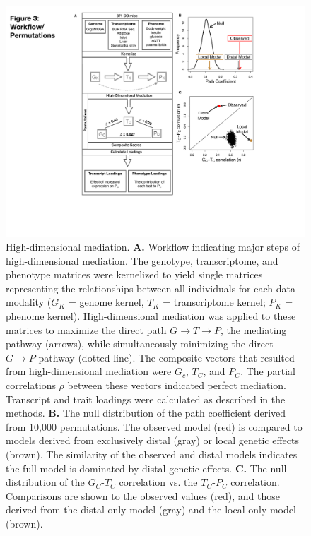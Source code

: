 \documentclass[
]{article}
\begin{document}
\begin{figure}[ht!]
\includegraphics[width=5in]{Figures/Fig3_workflow.pdf} 
\caption{High-dimensional mediation. \textbf{A.} Workflow 
indicating major steps of high-dimensional mediation. The 
genotype, transcriptome, and phenotype matrices were 
kernelized to yield single matrices representing the 
relationships between all individuals for each data modality 
($G_K$ = genome kernel, $T_K$ = transcriptome kernel; 
$P_K$ = phenome kernel). High-dimensional mediation 
was applied to these matrices to maximize the direct path 
$G \rightarrow T \rightarrow P$, the mediating pathway 
(arrows), while simultaneously minimizing the direct $G 
\rightarrow P$ pathway (dotted line). The composite 
vectors that resulted from high-dimensional mediation 
were $G_c$, $T_C$, and $P_C$. The partial correlations 
$\rho$ between these vectors indicated perfect mediation. 
Transcript and trait loadings were calculated as described 
in the methods. \textbf{B.} The null distribution of the path 
coefficient derived from 10,000 permutations. The observed model
(red) is compared to models derived from exclusively distal 
(gray) or local genetic effects (brown). The similarity of 
the observed and distal models indicates the full model is 
dominated by distal genetic effects. \textbf{C.} 
The null distribution of the $G_C$-$T_C$ correlation vs. 
the $T_C$-$P_C$ correlation. Comparisons are shown 
to the observed values (red), and those derived from the 
distal-only model (gray) and the local-only model (brown).
}
\label{fig:workflow}
\end{figure}
\end{document}
